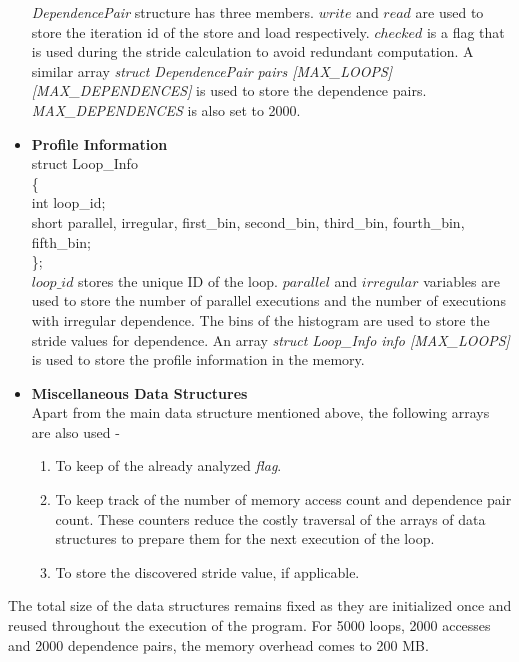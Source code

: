 \documentclass[10pt]{report}          %
\begin{document}
\begin{itemize}
\textit{DependencePair} structure has three members.  $write$ and $read$ are used to store the iteration id of the store and load respectively.  $checked$ is a flag that is used during the stride calculation to avoid redundant computation.  A similar array \textit{struct DependencePair  pairs [MAX\_LOOPS][MAX\_DEPENDENCES]} is used to store the dependence pairs. 
\\
\textit{MAX\_DEPENDENCES} is also set to 2000.

\item \textbf{Profile Information} \\

struct Loop\_Info\\
\{\\
	\hspace*{1 cm} int loop\_id;\\
	\hspace*{1 cm} short parallel, irregular, first\_bin, second\_bin, third\_bin, fourth\_bin, fifth\_bin;\\
	
\};\\

$loop\_id$ stores the unique ID of the loop. $parallel$ and $irregular$ variables are used to store the number of parallel executions and the number of executions with irregular dependence.  The bins of the histogram are used to store the stride values for dependence.  An array \textit{struct Loop\_Info  info [MAX\_LOOPS]} is used to store the profile information in the memory.

\item \textbf{Miscellaneous Data Structures} \\

Apart from the main data structure mentioned above, the following arrays are also used -

\begin{enumerate}
\item To keep of the already analyzed \textit{flag}.
\item To keep track of the number of memory access count and dependence pair count.  These counters reduce the costly traversal of the arrays of data structures to prepare them for the next execution of the loop.
\item To store the discovered stride value, if applicable.
\end{enumerate}
\end{itemize}

The total size of the data structures remains fixed as they are initialized once and reused throughout the execution of the program.  For 5000 loops, 2000 accesses and 2000 dependence pairs, the memory overhead comes to 200 MB.
\end{document}
